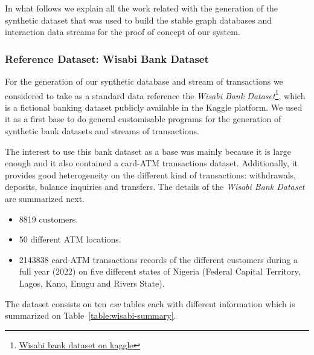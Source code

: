 
In what follows we explain all the work related with the generation of the synthetic dataset that was used to build the stable graph databases and interaction data streams for the proof of concept of our system.

\subsubsection*{Reference Dataset: Wisabi Bank Dataset}

For the generation of our synthetic database and stream of transactions we considered to take as a standard data reference the \emph{Wisabi Bank Dataset}\footnote{\href{https://www.kaggle.com/datasets/obinnaiheanachor/wisabi-bank-dataset}{Wisabi bank dataset on kaggle}}, which is a fictional banking dataset publicly available in the Kaggle platform. We used it as a first base to do general customisable programs for the generation of synthetic bank datasets and streams of transactions.

The interest to use this bank dataset as a base was mainly because it is large enough and it also contained a card-ATM transactions dataset. Additionally, it provides good heterogeneity on the different kind of transactions: withdrawals, deposits, balance inquiries and transfers. 
The details of the \emph{Wisabi Bank Dataset} are summarized next.
 
\begin{itemize}
    \item 8819 customers.
    \item 50 different ATM locations.
    \item 2143838 card-ATM transactions records of the different customers during a full year (2022) on five different states of Nigeria (Federal Capital Territory, Lagos, Kano, Enugu and Rivers State).
\end{itemize}

The dataset consists on ten \emph{csv} tables each with different information which is summarized on Table~\ref{table:wisabi-summary}.

